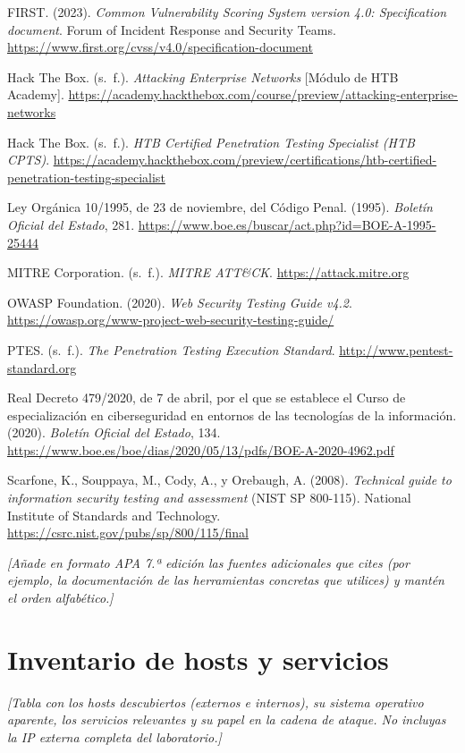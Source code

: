 \documentclass[11pt,a4paper,oneside]{report}
\newcommand{\guia}[1]{{\color{guia}\itshape[#1]}}
\begin{document}
\begin{list}{}{\leftmargin=1.27cm \itemindent=-1.27cm \itemsep=6pt}
  \item FIRST. (2023). \textit{Common Vulnerability Scoring System version 4.0: Specification document}. Forum of Incident Response and Security Teams. \url{https://www.first.org/cvss/v4.0/specification-document}
  \item Hack The Box. (s.~f.). \textit{Attacking Enterprise Networks} [Módulo de HTB Academy]. \url{https://academy.hackthebox.com/course/preview/attacking-enterprise-networks}
  \item Hack The Box. (s.~f.). \textit{HTB Certified Penetration Testing Specialist (HTB CPTS)}. \url{https://academy.hackthebox.com/preview/certifications/htb-certified-penetration-testing-specialist}
  \item Ley Orgánica 10/1995, de 23 de noviembre, del Código Penal. (1995). \textit{Boletín Oficial del Estado}, 281. \url{https://www.boe.es/buscar/act.php?id=BOE-A-1995-25444}
  \item MITRE Corporation. (s.~f.). \textit{MITRE ATT\&CK}. \url{https://attack.mitre.org}
  \item OWASP Foundation. (2020). \textit{Web Security Testing Guide v4.2}. \url{https://owasp.org/www-project-web-security-testing-guide/}
  \item PTES. (s.~f.). \textit{The Penetration Testing Execution Standard}. \url{http://www.pentest-standard.org}
  \item Real Decreto 479/2020, de 7 de abril, por el que se establece el Curso de especialización en ciberseguridad en entornos de las tecnologías de la información. (2020). \textit{Boletín Oficial del Estado}, 134. \url{https://www.boe.es/boe/dias/2020/05/13/pdfs/BOE-A-2020-4962.pdf}
  \item Scarfone, K., Souppaya, M., Cody, A., y Orebaugh, A. (2008). \textit{Technical guide to information security testing and assessment} (NIST SP 800-115). National Institute of Standards and Technology. \url{https://csrc.nist.gov/pubs/sp/800/115/final}
\end{list}

\guia{Añade en formato APA 7.ª edición las fuentes adicionales que cites (por ejemplo, la documentación de las herramientas concretas que utilices) y mantén el orden alfabético.}

\appendix
\renewcommand{\appendixname}{Anexo}

\chapter{Inventario de hosts y servicios}
\guia{Tabla con los hosts descubiertos (externos e internos), su sistema operativo aparente, los servicios relevantes y su papel en la cadena de ataque. No incluyas la IP externa completa del laboratorio.}
\end{document}

